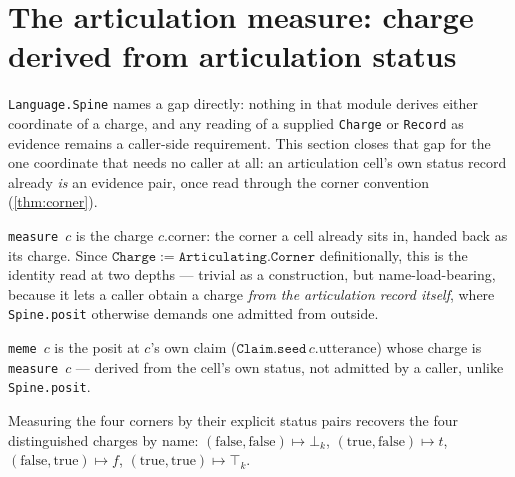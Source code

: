\section{The articulation measure: charge derived from articulation status}

\texttt{Language.Spine} names a gap directly: nothing in that module derives
either coordinate of a charge, and any reading of a supplied \texttt{Charge}
or \texttt{Record} as evidence remains a caller-side requirement. This
section closes that gap for the one coordinate that needs no caller at all:
an articulation cell's own status record already \emph{is} an evidence pair,
once read through the corner convention (\cref{thm:corner}).

\begin{proposition}\label{thm:measure}\leanok{}
\texttt{measure}~\(c\) is the charge \(c.\mathrm{corner}\): the corner a cell
already sits in, handed back as its charge. Since \(\mathtt{Charge} :=
\mathtt{Articulating.Corner}\) definitionally, this is the identity read at
two depths --- trivial as a construction, but name-load-bearing, because it
lets a caller obtain a charge \emph{from the articulation record itself},
where \texttt{Spine.posit} otherwise demands one admitted from outside.
\end{proposition}

\begin{proposition}\label{thm:meme}\leanok{}
\texttt{meme}~\(c\) is the posit at \(c\)'s own claim
(\(\texttt{Claim.seed}\,c.\mathrm{utterance}\)) whose charge is
\texttt{measure}~\(c\) --- derived from the cell's own status, not admitted
by a caller, unlike \texttt{Spine.posit}.
\end{proposition}

\begin{proposition}\label{thm:measure-tellings}\leanok{}
Measuring the four corners by their explicit status pairs recovers the four
distinguished charges by name: \((\mathrm{false}, \mathrm{false}) \mapsto
\bot_k\), \((\mathrm{true}, \mathrm{false}) \mapsto t\),
\((\mathrm{false}, \mathrm{true}) \mapsto f\), \((\mathrm{true},
\mathrm{true}) \mapsto \top_k\).
\end{proposition}

